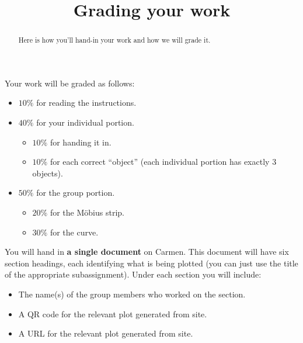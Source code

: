 \documentclass[noauthor,nooutcomes]{ximera}
\title{Grading your work}
\begin{document}
\begin{abstract}
  Here is how you'll hand-in your work and how we will grade it.
\end{abstract}
\maketitle

Your work will be graded as follows:

\begin{itemize}
\item $10\%$ for reading the instructions.
\item $40\%$ for your individual portion.
  \begin{itemize}
  \item $10\%$ for handing it in.
  \item $10\%$ for each correct ``object'' (each individual portion has exactly $3$ objects).
  \end{itemize}
\item $50\%$ for the group portion.
  \begin{itemize}
  \item $20\%$ for the M\"obius strip. 
  \item $30\%$ for the curve.
  \end{itemize}
\end{itemize}

You will hand in \textbf{a single document} on Carmen. This document
will have six section headings, each identifying what is being plotted
(you can just use the title of the appropriate subassignment).  Under
each section you will include:
\begin{itemize}
\item The name(s) of the group members who worked on the section.
\item A QR code for the relevant plot generated from
   site.
\item A URL for the relevant plot generated from
   site.
\end{itemize}
\end{document}
